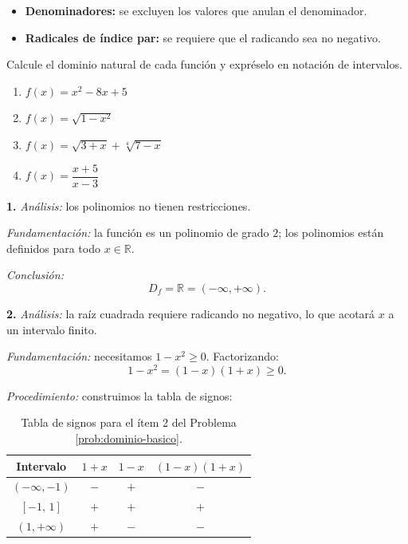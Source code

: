 \begin{itemize}
  \item \textbf{Denominadores:} se excluyen los valores que anulan el denominador.
  \item \textbf{Radicales de índice par:} se requiere que el radicando sea no negativo.
\end{itemize}



\begin{prob}\label{prob:dominio-basico}
Calcule el dominio natural de cada función y expréselo en notación de intervalos.
\begin{enumerate}
  \item $f(x) = x^2 - 8x + 5$
  \item $f(x) = \sqrt{1 - x^2}$
  \item $f(x) = \sqrt{3+x} + \sqrt[4]{7-x}$
  \item $f(x) = \dfrac{x+5}{x-3}$
\end{enumerate}

\begin{myproof}
\textbf{1.} \emph{Análisis:} los polinomios no tienen restricciones.

\emph{Fundamentación:} la función es un polinomio de grado $2$; los polinomios están definidos para todo $x \in \mathbb{R}$.

\emph{Conclusión:}
\[
  \boxed{D_f = \mathbb{R} = (-\infty,+\infty).}
\]

\medskip
\textbf{2.} \emph{Análisis:} la raíz cuadrada requiere radicando no negativo, lo que acotará $x$ a un intervalo finito.

\emph{Fundamentación:} necesitamos $1 - x^2 \geq 0$. Factorizando:
\[
  1 - x^2 = (1-x)(1+x) \geq 0.
\]

\emph{Procedimiento:} construimos la tabla de signos:

\begin{table}[H]
\centering
\begin{tabular}{|c|c|c|c|}
\hline
Intervalo & $1+x$ & $1-x$ & $(1-x)(1+x)$ \\
\hline
$(-\infty,-1)$ & $-$ & $+$ & $-$ \\
\hline
$[-1,\,1]$      & $+$ & $+$ & $+$ \\
\hline
$(1,+\infty)$   & $+$ & $-$ & $-$ \\
\hline
\end{tabular}
\caption{Tabla de signos para el ítem 2 del Problema \ref{prob:dominio-basico}.}
\end{table}


\end{myproof}
\end{prob}
